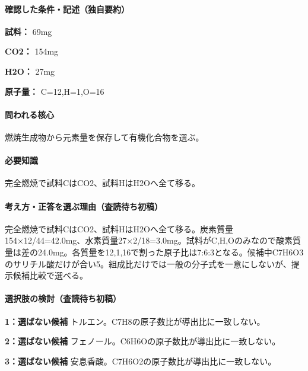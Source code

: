 \paragraph{確認した条件・記述（独自要約）}\mbox{}\par

\noindent\textbf{試料：} 69mg\par

\noindent\textbf{CO2：} 154mg\par

\noindent\textbf{H2O：} 27mg\par

\noindent\textbf{原子量：} C=\allowbreak{}12,H=\allowbreak{}1,O=\allowbreak{}16\par

\paragraph{問われる核心} 燃焼生成物から元素量を保存して有機化合物を選ぶ。

\paragraph{必要知識} 完全燃焼で試料CはCO2、試料HはH2Oへ全て移る。

\paragraph{考え方・正答を選ぶ理由（査読待ち初稿）} 完全燃焼で試料CはCO2、試料HはH2Oへ全て移る。炭素質量154×12/44=\allowbreak{}42.0mg、水素質量27×2/18=\allowbreak{}3.0mg。試料がC,H,Oのみなので酸素質量は差の24.0mg。各質量を12,1,16で割った原子比は7:6:3となる。候補中C7H6O3のサリチル酸だけが合い5。組成比だけでは一般の分子式を一意にしないが、提示候補比較で選べる。

\paragraph{選択肢の検討（査読待ち初稿）}\mbox{}\par

\noindent\textbf{1：選ばない候補} トルエン。C7H8の原子数比が導出比に一致しない。\par

\noindent\textbf{2：選ばない候補} フェノール。C6H6Oの原子数比が導出比に一致しない。\par

\noindent\textbf{3：選ばない候補} 安息香酸。C7H6O2の原子数比が導出比に一致しない。\par

